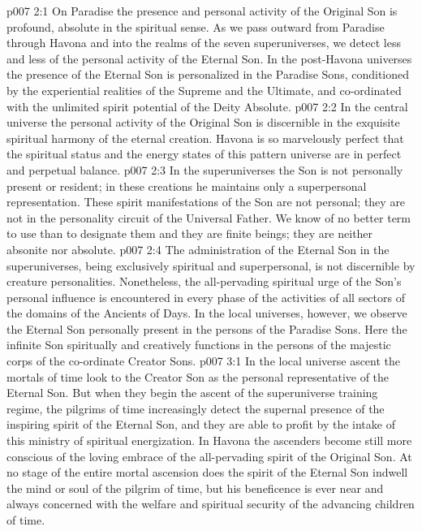 \vs p007 2:1 On Paradise the presence and personal activity of the Original Son is profound, absolute in the spiritual sense. As we pass outward from Paradise through Havona and into the realms of the seven superuniverses, we detect less and less of the personal activity of the Eternal Son. In the post\hyp{}Havona universes the presence of the Eternal Son is personalized in the Paradise Sons, conditioned by the experiential realities of the Supreme and the Ultimate, and co\hyp{}ordinated with the unlimited spirit potential of the Deity Absolute.
\vs p007 2:2 In the central universe the personal activity of the Original Son is discernible in the exquisite spiritual harmony of the eternal creation. Havona is so marvelously perfect that the spiritual status and the energy states of this pattern universe are in perfect and perpetual balance.
\vs p007 2:3 In the superuniverses the Son is not personally present or resident; in these creations he maintains only a superpersonal representation. These spirit manifestations of the Son are not personal; they are not in the personality circuit of the Universal Father. We know of no better term to use than to designate them  and they are finite beings; they are neither absonite nor absolute.
\vs p007 2:4 The administration of the Eternal Son in the superuniverses, being exclusively spiritual and superpersonal, is not discernible by creature personalities. Nonetheless, the all\hyp{}pervading spiritual urge of the Son’s personal influence is encountered in every phase of the activities of all sectors of the domains of the Ancients of Days. In the local universes, however, we observe the Eternal Son personally present in the persons of the Paradise Sons. Here the infinite Son spiritually and creatively functions in the persons of the majestic corps of the co\hyp{}ordinate Creator Sons.\plusone
{}
\vs p007 3:1 In the local universe ascent the mortals of time look to the Creator Son as the personal representative of the Eternal Son. But when they begin the ascent of the superuniverse training regime, the pilgrims of time increasingly detect the supernal presence of the inspiring spirit of the Eternal Son, and they are able to profit by the intake of this ministry of spiritual energization. In Havona the ascenders become still more conscious of the loving embrace of the all\hyp{}pervading spirit of the Original Son. At no stage of the entire mortal ascension does the spirit of the Eternal Son indwell the mind or soul of the pilgrim of time, but his beneficence is ever near and always concerned with the welfare and spiritual security of the advancing children of time.
